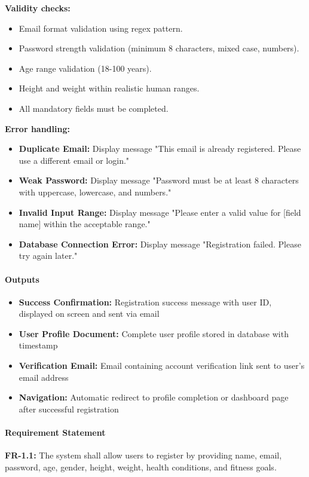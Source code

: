 \documentclass[12pt,a4paper]{article}
\begin{document}
\textbf{Validity checks:}
\begin{itemize}
    \item Email format validation using regex pattern.
    \item Password strength validation (minimum 8 characters, mixed case, numbers).
    \item Age range validation (18-100 years).
    \item Height and weight within realistic human ranges.
    \item All mandatory fields must be completed.
\end{itemize}

\textbf{Error handling:}
\begin{itemize}
    \item \textbf{Duplicate Email:} Display message "This email is already registered. Please use a different email or login."
    \item \textbf{Weak Password:} Display message "Password must be at least 8 characters with uppercase, lowercase, and numbers."
    \item \textbf{Invalid Input Range:} Display message "Please enter a valid value for [field name] within the acceptable range."
    \item \textbf{Database Connection Error:} Display message "Registration failed. Please try again later."
\end{itemize}

\paragraph{Outputs}
\begin{itemize}
    \item \textbf{Success Confirmation:} Registration success message with user ID, displayed on screen and sent via email
    \item \textbf{User Profile Document:} Complete user profile stored in database with timestamp
    \item \textbf{Verification Email:} Email containing account verification link sent to user's email address
    \item \textbf{Navigation:} Automatic redirect to profile completion or dashboard page after successful registration
\end{itemize}

\paragraph{Requirement Statement}
\textbf{FR-1.1:} The system shall allow users to register by providing name, email, password, age, gender, height, weight, health conditions, and fitness goals.
\end{document}

